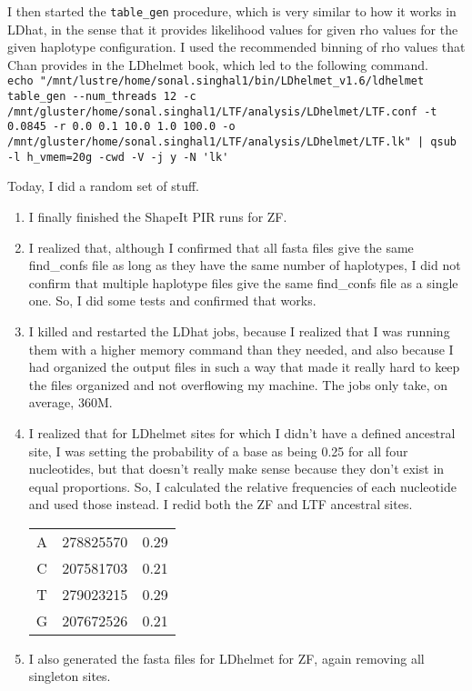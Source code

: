 \documentclass[idxtotoc,hyperref,openany,oneside]{labbook} %
\begin{document}
I then started the \verb+table_gen+ procedure, which is very similar to how it works in LDhat, in the sense that it provides likelihood values for given rho values for the given haplotype configuration. I used the recommended binning of rho values that Chan provides in the LDhelmet book, which led to the following command. \\

\verb+echo "/mnt/lustre/home/sonal.singhal1/bin/LDhelmet_v1.6/ldhelmet table_gen --num_threads 12 -c /mnt/gluster/home/sonal.singhal1/LTF/analysis/LDhelmet/LTF.conf -t 0.0845 -r 0.0 0.1 10.0 1.0 100.0 -o /mnt/gluster/home/sonal.singhal1/LTF/analysis/LDhelmet/LTF.lk" | qsub -l h_vmem=20g -cwd -V -j y -N 'lk'+


Today, I did a random set of stuff.
\begin{enumerate}
\item I finally finished the ShapeIt PIR runs for ZF.
\item I realized that, although I confirmed that all fasta files give the same find\_confs file as long as they have the same number of haplotypes, I did not confirm that multiple haplotype files give the same find\_confs file as a single one. So, I did some tests and confirmed that works.
\item I killed and restarted the LDhat jobs, because I realized that I was running them with a higher memory command than they needed, and also because I had organized the output files in such a way that made it really hard to keep the files organized and not overflowing my machine. The jobs only take, on average, 360M.
\item I realized that for LDhelmet sites for which I didn't have a defined ancestral site, I was setting the probability of a base as being 0.25 for all four nucleotides, but that doesn't really make sense because they don't exist in equal proportions. So, I calculated the relative frequencies of each nucleotide and used those instead. I redid both the ZF and LTF ancestral sites.
\begin{tabular}{ c c c }
  A & 278825570 & 0.29 \\
  C & 207581703 & 0.21 \\
  T & 279023215 & 0.29 \\
  G & 207672526 & 0.21 \\
\end{tabular}
\item I also generated the fasta files for LDhelmet for ZF, again removing all singleton sites.

\end{enumerate}
\end{document}
